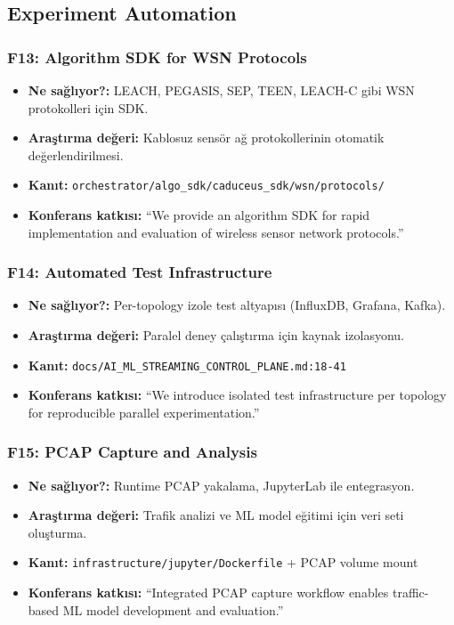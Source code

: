 \documentclass[10pt,a4paper]{article}
\begin{document}
\subsection{Experiment Automation}

\subsubsection{F13: Algorithm SDK for WSN Protocols}

\begin{itemize}
\item \textbf{Ne sağlıyor?:} LEACH, PEGASIS, SEP, TEEN, LEACH-C gibi WSN protokolleri için SDK.
\item \textbf{Araştırma değeri:} Kablosuz sensör ağ protokollerinin otomatik değerlendirilmesi.
\item \textbf{Kanıt:} \texttt{orchestrator/algo\_sdk/caduceus\_sdk/wsn/protocols/}
\item \textbf{Konferans katkısı:} ``We provide an algorithm SDK for rapid implementation and evaluation of wireless sensor network protocols.''
\end{itemize}

\subsubsection{F14: Automated Test Infrastructure}

\begin{itemize}
\item \textbf{Ne sağlıyor?:} Per-topology izole test altyapısı (InfluxDB, Grafana, Kafka).
\item \textbf{Araştırma değeri:} Paralel deney çalıştırma için kaynak izolasyonu.
\item \textbf{Kanıt:} \texttt{docs/AI\_ML\_STREAMING\_CONTROL\_PLANE.md:18-41}
\item \textbf{Konferans katkısı:} ``We introduce isolated test infrastructure per topology for reproducible parallel experimentation.''
\end{itemize}

\subsubsection{F15: PCAP Capture and Analysis}

\begin{itemize}
\item \textbf{Ne sağlıyor?:} Runtime PCAP yakalama, JupyterLab ile entegrasyon.
\item \textbf{Araştırma değeri:} Trafik analizi ve ML model eğitimi için veri seti oluşturma.
\item \textbf{Kanıt:} \texttt{infrastructure/jupyter/Dockerfile} + PCAP volume mount
\item \textbf{Konferans katkısı:} ``Integrated PCAP capture workflow enables traffic-based ML model development and evaluation.''
\end{itemize}
\end{document}
